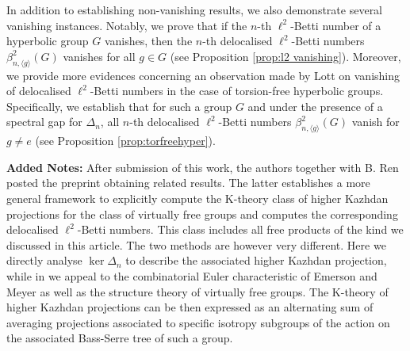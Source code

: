 \documentclass[a4paper,leqno,12pt]{article}
\numberwithin{equation}{section}
\theoremstyle{plain}
\newtheorem{introcorollary}[introtheorem]{Corollary}
\theoremstyle{definition}
\theoremstyle{remark}
\begin{document}
	
	In addition to establishing non-vanishing results, we also demonstrate several vanishing instances. Notably, we prove that if the $n$-th $\ell^2$-Betti number of a hyperbolic group $G$ vanishes, then the $n$-th delocalised $\ell^2$-Betti numbers $\beta^2_{n, \langle g \rangle} (G)$ vanishes for all $g\in G$ (see Proposition \ref{prop:l2 vanishing}).
	Moreover, we provide more evidences concerning an observation made by Lott on vanishing of delocalised $\ell^ 2$-Betti numbers in the case of torsion-free hyperbolic groups. Specifically, we establish that for such a group $G$ and under the presence of a spectral gap for $\Delta_n$, all $n$-th delocalised $\ell^2$-Betti numbers $\beta^2_{n, \langle g \rangle}(G)$ vanish for $g\neq e$ (see Proposition \ref{prop:torfreehyper}).
	
	\textbf{Added Notes:} After submission of this work, the authors together with B. Ren posted the preprint \cite{pooyarenwang2025}   obtaining related results. The latter establishes a more general framework to explicitly compute the K-theory class of higher Kazhdan projections for the class of virtually free groups and computes the corresponding delocalised $\ell^2$-Betti numbers. This class includes all free products of the kind we discussed in this article. The two methods are however very different. Here we directly analyse $\ker \Delta_n$  to describe the associated higher Kazhdan projection, while in \cite{pooyarenwang2025} we appeal to the combinatorial Euler characteristic of Emerson and Meyer \cite{EM} as well as the structure theory of virtually free groups. The K-theory of higher Kazhdan projections can be then expressed as an alternating sum of averaging projections associated to specific isotropy subgroups of the action on the associated Bass-Serre tree of such a group.
	
\end{document}

